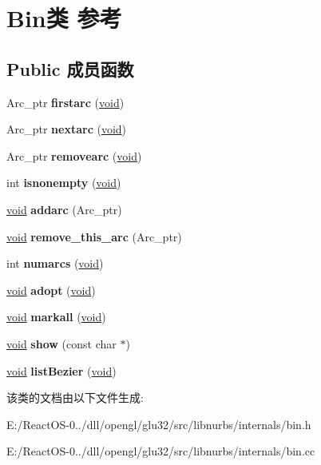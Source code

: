 \hypertarget{class_bin}{}\section{Bin类 参考}
\label{class_bin}
\subsection*{Public 成员函数}
\begin{DoxyCompactItemize}
\item 
\mbox{\label{class_bin_a77a7ee7c56d38bfed3e3d5d3af270f98}} 
Arc\+\_\+ptr {\bfseries firstarc} (\hyperlink{interfacevoid}{void})
\item 
\mbox{\label{class_bin_a904391b7360b85b3716bd890c0643d3d}} 
Arc\+\_\+ptr {\bfseries nextarc} (\hyperlink{interfacevoid}{void})
\item 
\mbox{\label{class_bin_a093b7a843d7ee675eff060dccfa218fb}} 
Arc\+\_\+ptr {\bfseries removearc} (\hyperlink{interfacevoid}{void})
\item 
\mbox{\label{class_bin_a3431c65a0b59e2ad4e533300a499d07c}} 
int {\bfseries isnonempty} (\hyperlink{interfacevoid}{void})
\item 
\mbox{\label{class_bin_af253a8326079a19cba1e1fd7ce06a3d1}} 
\hyperlink{interfacevoid}{void} {\bfseries addarc} (Arc\+\_\+ptr)
\item 
\mbox{\label{class_bin_add761c8564f36daada6bc1f311ed4516}} 
\hyperlink{interfacevoid}{void} {\bfseries remove\+\_\+this\+\_\+arc} (Arc\+\_\+ptr)
\item 
\mbox{\label{class_bin_a1cc8dd39d466cef5d6e8d686a39b8268}} 
int {\bfseries numarcs} (\hyperlink{interfacevoid}{void})
\item 
\mbox{\label{class_bin_a65a8b6959332bb87e30c065f36163de3}} 
\hyperlink{interfacevoid}{void} {\bfseries adopt} (\hyperlink{interfacevoid}{void})
\item 
\mbox{\label{class_bin_a045141b79bbc451546dd55152be3dd66}} 
\hyperlink{interfacevoid}{void} {\bfseries markall} (\hyperlink{interfacevoid}{void})
\item 
\mbox{\label{class_bin_a1df501c3d30113a902d786f8615198ce}} 
\hyperlink{interfacevoid}{void} {\bfseries show} (const char $\ast$)
\item 
\mbox{\label{class_bin_aa1ede197329023473fb215d1068f8ac3}} 
\hyperlink{interfacevoid}{void} {\bfseries list\+Bezier} (\hyperlink{interfacevoid}{void})
\end{DoxyCompactItemize}


该类的文档由以下文件生成\+:\begin{DoxyCompactItemize}
\item 
E\+:/\+React\+O\+S-\/0../dll/opengl/glu32/src/libnurbs/internals/bin.\+h\item 
E\+:/\+React\+O\+S-\/0../dll/opengl/glu32/src/libnurbs/internals/bin.\+cc\end{DoxyCompactItemize}
